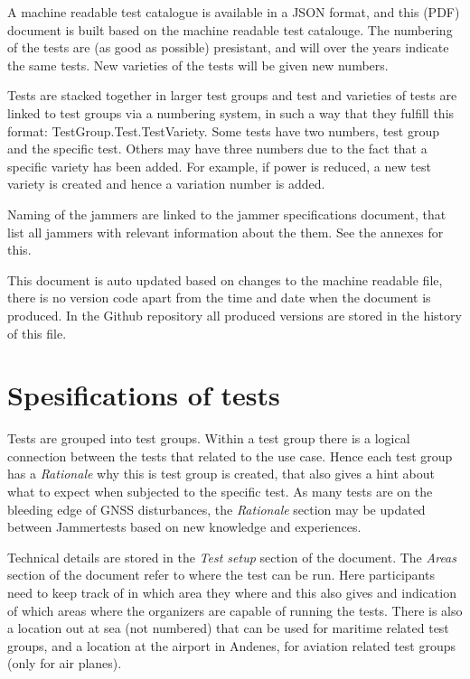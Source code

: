 \documentclass[a4paper]{book}
\begin{document}
\newline

A machine readable test catalogue is available in a JSON format, and this (PDF) document is built based on the machine readable test catalouge. The numbering of the tests are (as good as possible) presistant, and will over the years indicate the same tests. New varieties of the tests will be given new numbers.

Tests are stacked together in larger test groups and test and varieties of tests are linked to test groups via a numbering system, in such a way that they fulfill this format: TestGroup.Test.TestVariety. Some tests have two numbers, test group and the specific test. Others may have three numbers due to the fact that a specific variety has been added. For example, if power is reduced, a new test variety is created and hence a variation number is added.

\newline

Naming of the jammers are linked to the jammer specifications document, that list all jammers with relevant information about the them. See the annexes for this.

\newline

This document is auto updated based on changes to the machine readable file, there is no version code apart from the time and date when the document is produced. In the Github repository all produced versions are stored in the history of this file.

\section{Spesifications of tests}
Tests are grouped into test groups. Within a test group there is a logical connection between the tests that related to the use case. Hence each test group has a \textit{Rationale} why this is test group is created, that also gives a hint about what to expect when subjected to the specific test. As many tests are on the bleeding edge of GNSS disturbances, the \textit{Rationale} section may be updated between Jammertests based on new knowledge and experiences. 

\newline

Technical details are stored in the \textit{Test setup} section of the document. The \textit{Areas} section of the document refer to where the test can be run. Here participants need to keep track of in which area they where and this also gives and indication of which areas where the organizers are capable of running the tests. There is also a location out at sea (not numbered) that can be used for maritime related test groups, and a location at the airport in Andenes, for aviation related test groups (only for air planes).
\end{document}

